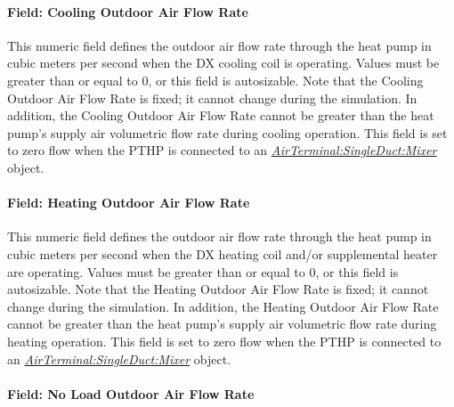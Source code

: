 \paragraph{Field: Cooling Outdoor Air Flow Rate}\label{field-cooling-outdoor-air-flow-rate-1}

This numeric field defines the outdoor air flow rate through the heat pump in cubic meters per second when the DX cooling coil is operating. Values must be greater than or equal to 0, or this field is autosizable. Note that the Cooling Outdoor Air Flow Rate is fixed; it cannot change during the simulation. In addition, the Cooling Outdoor Air Flow Rate cannot be greater than the heat pump's supply air volumetric flow rate during cooling operation.
This field is set to zero flow when the PTHP is connected to an \textit{\hyperref[airterminalsingleductmixer]{AirTerminal:SingleDuct:Mixer}} object.

\paragraph{Field: Heating Outdoor Air Flow Rate}\label{field-heating-outdoor-air-flow-rate-1}

This numeric field defines the outdoor air flow rate through the heat pump in cubic meters per second when the DX heating coil and/or supplemental heater are operating. Values must be greater than or equal to 0, or this field is autosizable. Note that the Heating Outdoor Air Flow Rate is fixed; it cannot change during the simulation. In addition, the Heating Outdoor Air Flow Rate cannot be greater than the heat pump's supply air volumetric flow rate during heating operation. This field is set to zero flow when the PTHP is connected to an \textit{\hyperref[airterminalsingleductmixer]{AirTerminal:SingleDuct:Mixer}} object.

\paragraph{Field: No Load Outdoor Air Flow Rate}\label{field-no-load-outdoor-air-flow-rate-1}

